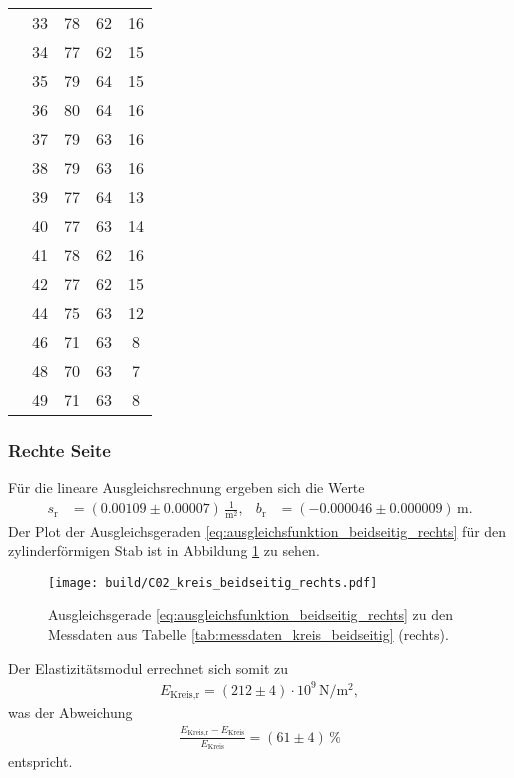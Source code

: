 \begin{table}[H]
\begin{tabular}[]{S S[table-format = 2.0] S S S[table-format = 2.0]}
                 & 33 & 78 & 62 & 16 \\
                 & 34 & 77 & 62 & 15 \\
                 & 35 & 79 & 64 & 15 \\
                 & 36 & 80 & 64 & 16 \\
                 & 37 & 79 & 63 & 16 \\
                 & 38 & 79 & 63 & 16 \\
                 & 39 & 77 & 64 & 13 \\
                 & 40 & 77 & 63 & 14 \\
                 & 41 & 78 & 62 & 16 \\
                 & 42 & 77 & 62 & 15 \\
                 & 44 & 75 & 63 & 12 \\
                 & 46 & 71 & 63 &  8 \\
                 & 48 & 70 & 63 &  7 \\
                 & 49 & 71 & 63 &  8 \\
        \bottomrule
    \end{tabular}
\end{table}

\subsubsection{Rechte Seite}
Für die lineare Ausgleichsrechnung ergeben sich die Werte
\begin{align*}
    s_\text{r} &= (\num{0.00109} \pm \num{0.00007}) \, \frac{1}{\unit{\meter^2}}, & 
    b_\text{r} &= (\num{-0.000046} \pm \num{0.000009}) \, \unit{\meter}.
\end{align*}
Der Plot der Ausgleichsgeraden \eqref{eq:ausgleichsfunktion_beidseitig_rechts} für den zylinderförmigen Stab
ist in Abbildung \ref{fig:plot_kreis_beidseitig_rechts} zu sehen.
%
\begin{figure}[H]
    \centering
    \texttt{[image: build/C02\_kreis\_beidseitig\_rechts.pdf]}
    \caption{Ausgleichsgerade \eqref{eq:ausgleichsfunktion_beidseitig_rechts} zu den Messdaten aus Tabelle \ref{tab:messdaten_kreis_beidseitig} (rechts).}
    \label{fig:plot_kreis_beidseitig_rechts}
\end{figure}

\noindent
Der Elastizitätsmodul errechnet sich somit zu
\begin{align}
    E_\text{Kreis,r} = (\num{212} \pm \num{4}) \cdot 10^9 \, \unit{\newton\per\meter^2},
\end{align}
was der Abweichung
\begin{align*}
    \frac{E_\text{Kreis,r} - E_\text{Kreis}}{E_\text{Kreis}} = (\num{61} \pm \num{4}) \, \%
\end{align*}
entspricht.




